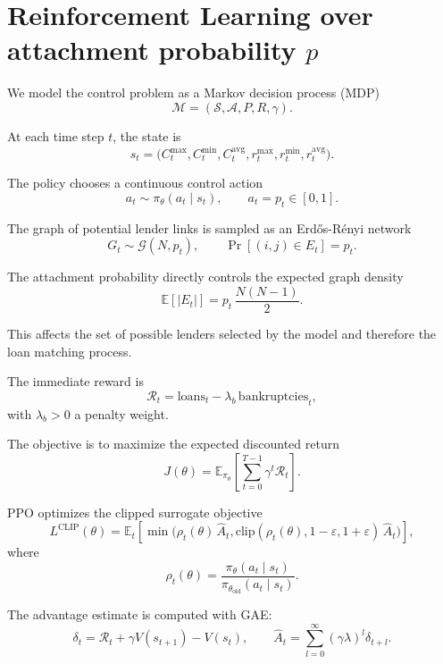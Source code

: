 \documentclass{article}
\begin{document}
\pagestyle{empty}

\section*{Reinforcement Learning over attachment probability $p$}

We model the control problem as a Markov decision process (MDP)
\[
\mathcal{M} = (\mathcal{S}, \mathcal{A}, P, R, \gamma).
\]

At each time step $t$, the state is
\[
s_t = \big(C^{\max}_t, C^{\min}_t, C^{\mathrm{avg}}_t, r^{\max}_t, r^{\min}_t, r^{\mathrm{avg}}_t\big).
\]

The policy chooses a continuous control action
\[
a_t \sim \pi_\theta(a_t \mid s_t), \qquad a_t = p_t \in [0,1].
\]

The graph of potential lender links is sampled as an Erd\H{o}s-R\'enyi network
\[
G_t \sim \mathcal{G}(N, p_t),
\qquad
\Pr[(i,j) \in E_t] = p_t.
\]

The attachment probability directly controls the expected graph density
\[
\mathbb{E}[|E_t|] = p_t\,\frac{N(N-1)}{2}.
\]

This affects the set of possible lenders selected by the model and therefore the loan matching process.

The immediate reward is
\[
\mathcal{R}_t = \text{loans}_t - \lambda_b\,\text{bankruptcies}_t,
\]
with $\lambda_b > 0$ a penalty weight.

The objective is to maximize the expected discounted return
\[
J(\theta) = \mathbb{E}_{\pi_\theta}\left[ \sum_{t=0}^{T-1} \gamma^t \mathcal{R}_t \right].
\]

PPO optimizes the clipped surrogate objective
\[
L^{\mathrm{CLIP}}(\theta) =
\mathbb{E}_t\left[
\min\big(
\rho_t(\theta)\,\hat{A}_t,
\mathrm{clip}(\rho_t(\theta), 1-\varepsilon, 1+\varepsilon)\,\hat{A}_t
\big)
\right],
\]
where
\[
\rho_t(\theta) = \frac{\pi_\theta(a_t\mid s_t)}{\pi_{\theta_{\mathrm{old}}}(a_t\mid s_t)}.
\]

The advantage estimate is computed with GAE:
\[
\delta_t = \mathcal{R}_t + \gamma V(s_{t+1}) - V(s_t),
\qquad
\hat{A}_t = \sum_{l=0}^{\infty} (\gamma \lambda)^l \delta_{t+l}.
\]
\end{document}
